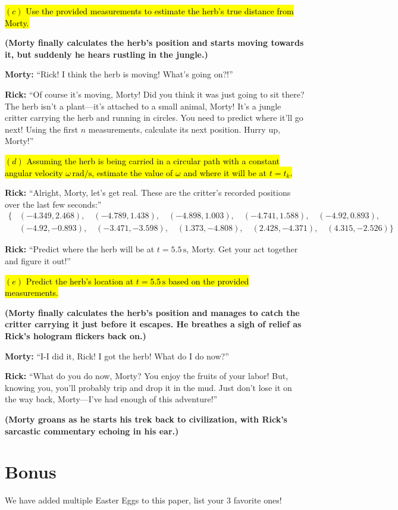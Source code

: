 \documentclass[a4paper, 12pt]{exam}
\begin{document}
\bigskip

\hl{$(c)$ Use the provided measurements to estimate the herb's true distance from Morty.}
\bigskip

\noindent \textbf{(Morty finally calculates the herb’s position and starts moving towards it, but suddenly he hears rustling in the jungle.)}

\bigskip
\noindent \textbf{Morty:} “Rick! I think the herb is moving! What’s going on?!” \bigskip

\noindent \textbf{Rick:} “Of course it’s moving, Morty! Did you think it was just going to sit there? The herb isn’t a plant—it’s attached to a small animal, Morty! It’s a jungle critter carrying the herb and running in circles. You need to predict where it’ll go next! Using the first \(n\) measurements, calculate its next position. Hurry up, Morty!”

\bigskip

\hl{$(d)$ Assuming the herb is being carried in a circular path with a constant angular velocity $\omega \, \mathrm{rad/s}$, estimate the value of $\omega$ and where it will be at $t = t_k$.}

\bigskip
\noindent \textbf{Rick:} “Alright, Morty, let’s get real. These are the critter’s recorded positions over the last few seconds:”
\begin{align*}
\{
&(-4.349, 2.468), \quad (-4.789, 1.438), \quad (-4.898, 1.003), \quad (-4.741, 1.588), \quad (-4.92, 0.893), \\
&(-4.92, -0.893), \quad (-3.471, -3.598), \quad (1.373, -4.808), \quad (2.428, -4.371), \quad (4.315, -2.526)
\}
\end{align*}

\noindent \textbf{Rick:} “Predict where the herb will be at \(t = 5.5 \, \mathrm{s}\), Morty. Get your act together and figure it out!”

\bigskip

\hl{$(e)$ Predict the herb's location at $t = 5.5 \, \mathrm{s}$ based on the provided measurements.}
\bigskip

\noindent \textbf{(Morty finally calculates the herb’s position and manages to catch the critter carrying it just before it escapes. He breathes a sigh of relief as Rick’s hologram flickers back on.)}

\bigskip
\noindent \textbf{Morty:} “I-I did it, Rick! I got the herb! What do I do now?” \bigskip

\noindent \textbf{Rick:} “What do you do now, Morty? You enjoy the fruits of your labor! But, knowing you, you’ll probably trip and drop it in the mud. Just don’t lose it on the way back, Morty—I’ve had enough of this adventure!”

\bigskip

\noindent \textbf{(Morty groans as he starts his trek back to civilization, with Rick’s sarcastic commentary echoing in his ear.)}

\section*{Bonus}
We have added multiple Easter Eggs to this paper, list your 3 favorite ones!
\end{document}
